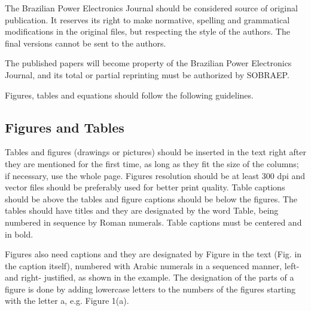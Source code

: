 \documentclass[english]{sobraep}
\begin{document}
The Brazilian Power Electronics Journal should be considered source of original publication. It reserves its right to make normative, spelling and grammatical modifications in the original files, but respecting the style of the authors. The final versions cannot be sent to the authors.

The published papers will become property of the Brazilian Power Electronics Journal, and its total or partial reprinting must be authorized by SOBRAEP.

Figures, tables and equations should follow the following guidelines.

\subsection{Figures and Tables}

Tables and figures (drawings or pictures) should be inserted in the text right after they are mentioned for the first time, as long as they fit the size of the columns; if necessary, use the whole page. Figures resolution should be at least 300 dpi and vector files should be preferably used for better print quality. Table captions should be above the tables and figure captions should be below the figures. The tables should have titles and they are designated by the word Table, being numbered in sequence by Roman numerals. Table captions must be centered and in bold.

Figures also need captions and they are designated by Figure in the text (Fig. in the caption itself), numbered with Arabic numerals in a sequenced manner, left- and right- justified, as shown in the example. The designation of the parts of a figure is done by adding lowercase letters to the numbers of the figures starting with the letter a, e.g. Figure 1(a).
\end{document}

